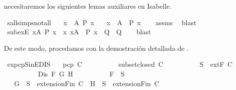 \begin{isabellebody}
\begin{isamarkuptext}
  necesitaremos los siguientes lemas auxiliares en Isabelle.%
\end{isamarkuptext}\isamarkuptrue%
\isamarkupfalse%
\ sall{\isacharunderscore}simps{\isacharunderscore}not{\isacharunderscore}all{\isacharcolon}\isanewline
\ \ \ {\isachardoublequoteopen}{\isasymnot}{\isacharparenleft}{\isasymforall}x\ {\isasymsubseteq}\ A{\isachardot}\ P\ x{\isacharparenright}{\isachardoublequoteclose}\isanewline
\ \ \ {\isachardoublequoteopen}{\isasymexists}x\ {\isasymsubseteq}\ A{\isachardot}\ {\isacharparenleft}{\isasymnot}\ P\ x{\isacharparenright}{\isachardoublequoteclose}\isanewline
%
\isadelimproof
\ \ %
\endisadelimproof
%
\isatagproof
{}\isamarkupfalse%
\ assms\ \isamarkupfalse%
\ blast%
\endisatagproof
{\isafoldproof}%
%
\isadelimproof
\isanewline
%
\endisadelimproof
\isanewline
{}\isamarkupfalse%
\ subexE{\isacharcolon}\ {\isachardoublequoteopen}{\isasymexists}x{\isasymsubseteq}A{\isachardot}\ P\ x\ {\isasymLongrightarrow}\ {\isacharparenleft}{\isasymAnd}x{\isachardot}\ x{\isasymsubseteq}A\ {\isasymLongrightarrow}\ P\ x\ {\isasymLongrightarrow}\ Q{\isacharparenright}\ {\isasymLongrightarrow}\ Q{\isachardoublequoteclose}\isanewline
%
\isadelimproof
\ \ %
\endisadelimproof
%
\isatagproof
{}\isamarkupfalse%
\ blast%
\endisatagproof
{\isafoldproof}%
%
\isadelimproof
%
\endisadelimproof
%
\begin{isamarkuptext}%
De este modo, procedamos con la demostración detallada de .%
\end{isamarkuptext}\isamarkuptrue%
\isamarkupfalse%
\ ex{}{\isacharunderscore}pcp{\isacharunderscore}SinE{\isacharunderscore}DIS{\isacharcolon}\isanewline
\ \ \ {\isachardoublequoteopen}pcp\ C{\isachardoublequoteclose}\isanewline
\ \ \ \ \ \ \ \ \ \ {\isachardoublequoteopen}subset{\isacharunderscore}closed\ C{\isachardoublequoteclose}\isanewline
\ \ \ \ \ \ \ \ \ \ {\isachardoublequoteopen}S\ {\isasymin}\ {\isacharparenleft}extF\ C{\isacharparenright}{\isachardoublequoteclose}\isanewline
\ \ \ \ \ \ \ \ \ \ {\isachardoublequoteopen}Dis\ F\ G\ H{\isachardoublequoteclose}\isanewline
\ \ \ \ \ \ \ \ \ \ {\isachardoublequoteopen}F\ {\isasymin}\ S{\isachardoublequoteclose}\isanewline
\ \ \ {\isachardoublequoteopen}{\isacharbraceleft}G{\isacharbraceright}\ {\isasymunion}\ S\ {\isasymin}\ {\isacharparenleft}extensionFin\ C{\isacharparenright}\ {\isasymor}\ {\isacharbraceleft}H{\isacharbraceright}\ {\isasymunion}\ S\ {\isasymin}\ {\isacharparenleft}extensionFin\ C{\isacharparenright}{\isachardoublequoteclose}\isanewline

\end{isabellebody}
